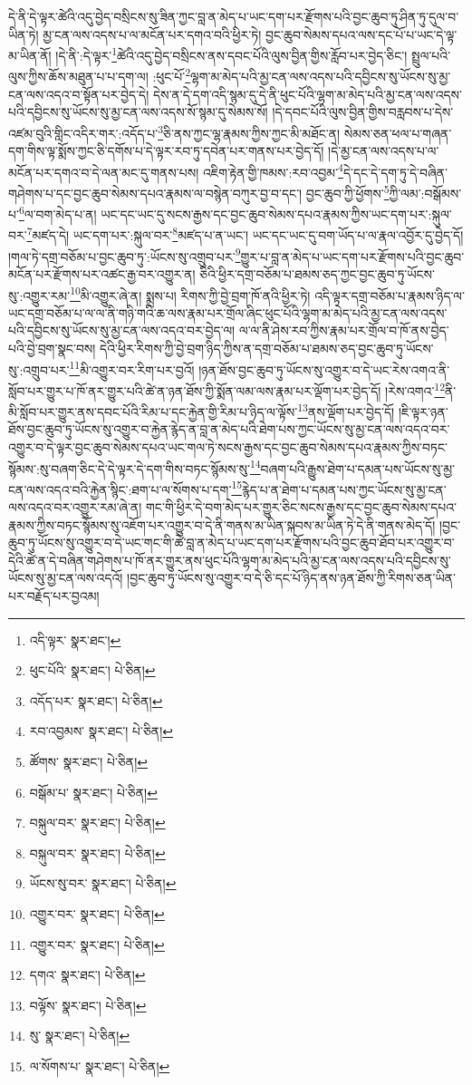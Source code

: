 དེ་ནི་དེ་ལྟར་ཚེའི་འདུ་བྱེད་བསྲིངས་སུ་ཟིན་ཀྱང་བླ་ན་མེད་པ་ཡང་དག་པར་རྫོགས་པའི་བྱང་ཆུབ་ཏུ་ཤིན་ཏུ་དུལ་བ་ཡིན་ཏེ། མྱ་ངན་ལས་འདས་པ་ལ་མངོན་པར་དགའ་བའི་ཕྱིར་ཏེ། བྱང་ཆུབ་སེམས་དཔའ་ལས་དང་པོ་པ་ཡང་དེ་ལྟ་མ་ཡིན་ནོ། །དེ་ནི་:དེ་ལྟར་\footnote{འདི་ལྟར་  སྣར་ཐང་། }ཚེའི་འདུ་བྱེད་བསྲིངས་ནས་དབང་པོའི་ལུས་བྱིན་གྱིས་རློབ་པར་བྱེད་ཅིང་། སྤྲུལ་པའི་ལུས་ཀྱིས་ཆོས་མཐུན་པ་པ་དག་ལ། :ཕུང་པོ་\footnote{ཕུང་པོའི་  སྣར་ཐང་།  པེ་ཅིན། }ལྷག་མ་མེད་པའི་མྱ་ངན་ལས་འདས་པའི་དབྱིངས་སུ་ཡོངས་སུ་མྱ་ངན་ལས་འདའ་བ་སྟོན་པར་བྱེད་དེ། དེས་ན་དེ་དག་འདི་སྙམ་དུ་དེ་ནི་ཕུང་པོའི་ལྷག་མ་མེད་པའི་མྱ་ངན་ལས་འདས་པའི་དབྱིངས་སུ་ཡོངས་སུ་མྱ་ངན་ལས་འདས་སོ་སྙམ་དུ་སེམས་སོ། །དེ་དབང་པོའི་ལུས་བྱིན་གྱིས་བརླབས་པ་དེས་འཛམ་བུའི་གླིང་འདིར་གར་:འདོད་པ་\footnote{འདོད་པར་  སྣར་ཐང་།  པེ་ཅིན། }ཅི་ནས་ཀྱང་ལྷ་རྣམས་ཀྱིས་ཀྱང་མི་མཐོང་ན། སེམས་ཅན་ཕལ་པ་གཞན་དག་གིས་ལྟ་སྨོས་ཀྱང་ཅི་དགོས་པ་དེ་ལྟར་རབ་ཏུ་དབེན་པར་གནས་པར་བྱེད་དོ། །དེ་མྱ་ངན་ལས་འདས་པ་ལ་མངོན་པར་དགའ་བ་དེ་ལན་མང་དུ་གནས་པས། འཇིག་རྟེན་གྱི་ཁམས་:རབ་འབྱམ་\footnote{རབ་འབྱམས་  སྣར་ཐང་།  པེ་ཅིན། }དེ་དང་དེ་དག་ཏུ་དེ་བཞིན་གཤེགས་པ་དང་བྱང་ཆུབ་སེམས་དཔའ་རྣམས་ལ་བསྙེན་བཀུར་བྱ་བ་དང་། བྱང་ཆུབ་ཀྱི་ཕྱོགས་\footnote{ཚོགས་  སྣར་ཐང་།  པེ་ཅིན། }ཀྱི་ལམ་:བསྒོམས་པ་\footnote{བསྒོམ་པ་  སྣར་ཐང་།  པེ་ཅིན། }ལ་བག་མེད་པ་ན། ཡང་དང་ཡང་དུ་སངས་རྒྱས་དང་བྱང་ཆུབ་སེམས་དཔའ་རྣམས་ཀྱིས་ཡང་དག་པར་:སྐུལ་བར་\footnote{བསྐུལ་བར་  སྣར་ཐང་།  པེ་ཅིན། }མཛད་དེ། ཡང་དག་པར་:སྐུལ་བར་\footnote{བསྐུལ་བར་  སྣར་ཐང་།  པེ་ཅིན། }མཛད་པ་ན་ཡང་། ཡང་དང་ཡང་དུ་བག་ཡོད་པ་ལ་རྣལ་འབྱོར་དུ་བྱེད་དོ། །གལ་ཏེ་དགྲ་བཅོམ་པ་བྱང་ཆུབ་ཏུ་:ཡོངས་སུ་འགྲུབ་པར་\footnote{ཡོངས་སུ་བར་  སྣར་ཐང་།  པེ་ཅིན། }གྱུར་པ་བླ་ན་མེད་པ་ཡང་དག་པར་རྫོགས་པའི་བྱང་ཆུབ་མངོན་པར་རྫོགས་པར་འཚང་རྒྱ་བར་འགྱུར་ན། ཅིའི་ཕྱིར་དགྲ་བཅོམ་པ་ཐམས་ཅད་ཀྱང་བྱང་ཆུབ་ཏུ་ཡོངས་སུ་:འགྱུར་རམ་\footnote{འགྱུར་བར་  སྣར་ཐང་།  པེ་ཅིན། }མི་འགྱུར་ཞེ་ན། སྨྲས་པ། རིགས་ཀྱི་བྱེ་བྲག་ཁོ་ནའི་ཕྱིར་ཏེ། འདི་ལྟར་དགྲ་བཅོམ་པ་རྣམས་ཉིད་ལ་ཡང་དགྲ་བཅོམ་པ་ལ་ལ་ནི་གཉི་གའི་ཆ་ལས་རྣམ་པར་གྲོལ་ཞིང་ཕུང་པོའི་ལྷག་མ་མེད་པའི་མྱ་ངན་ལས་འདས་པའི་དབྱིངས་སུ་ཡོངས་སུ་མྱ་ངན་ལས་འདའ་བར་བྱེད་ལ། ལ་ལ་ནི་ཤེས་རབ་ཀྱིས་རྣམ་པར་གྲོལ་བ་ཁོ་ནས་བྱེད་པའི་བྱེ་བྲག་སྣང་བས། དེའི་ཕྱིར་རིགས་ཀྱི་བྱེ་བྲག་ཉིད་ཀྱིས་ན་དགྲ་བཅོམ་པ་ཐམས་ཅད་བྱང་ཆུབ་ཏུ་ཡོངས་སུ་:འགྲུབ་པར་\footnote{འགྱུར་བར་  སྣར་ཐང་།  པེ་ཅིན། }མི་འགྱུར་བར་རིག་པར་བྱའོ། །ཉན་ཐོས་བྱང་ཆུབ་ཏུ་ཡོངས་སུ་འགྱུར་བ་དེ་ཡང་རེས་འགའ་ནི་སློབ་པར་གྱུར་པ་ཁོ་ནར་གྱུར་པའི་ཚེ་ན་ཉན་ཐོས་ཀྱི་སྨོན་ལམ་ལས་རྣམ་པར་ལྡོག་པར་བྱེད་དོ། །རེས་འགའ་\footnote{དགའ་  སྣར་ཐང་།  པེ་ཅིན། }ནི་མི་སློབ་པར་གྱུར་ནས་དབང་པོའི་རིམ་པ་དང་རྐྱེན་གྱི་རིམ་པ་ཉིད་ལ་ལྟོས་\footnote{བལྟོས་  སྣར་ཐང་།  པེ་ཅིན། }ནས་ལྡོག་པར་བྱེད་དོ། །ཇི་ལྟར་ཉན་ཐོས་བྱང་ཆུབ་ཏུ་ཡོངས་སུ་འགྱུར་བ་རྐྱེན་རྙེད་ན་བླ་ན་མེད་པའི་ཐེག་པས་ཀྱང་ཡོངས་སུ་མྱ་ངན་ལས་འདའ་བར་འགྱུར་བ་དེ་ལྟར་བྱང་ཆུབ་སེམས་དཔའ་ཡང་གལ་ཏེ་སངས་རྒྱས་དང་བྱང་ཆུབ་སེམས་དཔའ་རྣམས་ཀྱིས་བཏང་སྙོམས་:སུ་བཞག་ཅིང་དེ་དེ་ལྟར་དེ་དག་གིས་བཏང་སྙོམས་སུ་\footnote{སུ་  སྣར་ཐང་།  པེ་ཅིན། }བཞག་པའི་རྒྱུས་ཐེག་པ་དམན་པས་ཡོངས་སུ་མྱ་ངན་ལས་འདའ་བའི་རྐྱེན་སྙིང་:ཐག་པ་ལ་སོགས་པ་དག་\footnote{ལ་སོགས་པ་  སྣར་ཐང་།  པེ་ཅིན། }རྙེད་པ་ན་ཐེག་པ་དམན་པས་ཀྱང་ཡོངས་སུ་མྱ་ངན་ལས་འདའ་བར་འགྱུར་རམ་ཞེ་ན། གང་གི་ཕྱིར་དེ་བག་མེད་པར་གྱུར་ཅིང་སངས་རྒྱས་དང་བྱང་ཆུབ་སེམས་དཔའ་རྣམས་ཀྱིས་བཏང་སྙོམས་སུ་འཇོག་པར་འགྱུར་བ་དེ་ནི་གནས་མ་ཡིན་སྐབས་མ་ཡིན་ཏེ་དེ་ནི་གནས་མེད་དོ། །བྱང་ཆུབ་ཏུ་ཡོངས་སུ་འགྱུར་བ་དེ་ཡང་གང་གི་ཚེ་བླ་ན་མེད་པ་ཡང་དག་པར་རྫོགས་པའི་བྱང་ཆུབ་ཐོབ་པར་འགྱུར་བ་དེའི་ཚེ་ན་དེ་བཞིན་གཤེགས་པ་ཁོ་ནར་གྱུར་ནས་ཕུང་པོའི་ལྷག་མ་མེད་པའི་མྱ་ངན་ལས་འདས་པའི་དབྱིངས་སུ་ཡོངས་སུ་མྱ་ངན་ལས་འདའོ། །བྱང་ཆུབ་ཏུ་ཡོངས་སུ་འགྱུར་བ་དེ་ཅི་དང་པོ་ཉིད་ནས་ཉན་ཐོས་ཀྱི་རིགས་ཅན་ཡིན་པར་བརྗོད་པར་བྱའམ། 